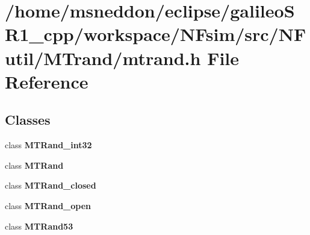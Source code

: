\section{/home/msneddon/eclipse/galileoSR1\_\-cpp/workspace/NFsim/src/NFutil/MTrand/mtrand.h File Reference}
\label{mtrand_8h}


\subsection*{Classes}
\begin{CompactItemize}
\item 
class {\bf MTRand\_\-int32}
\item 
class {\bf MTRand}
\item 
class {\bf MTRand\_\-closed}
\item 
class {\bf MTRand\_\-open}
\item 
class {\bf MTRand53}
\end{CompactItemize}

